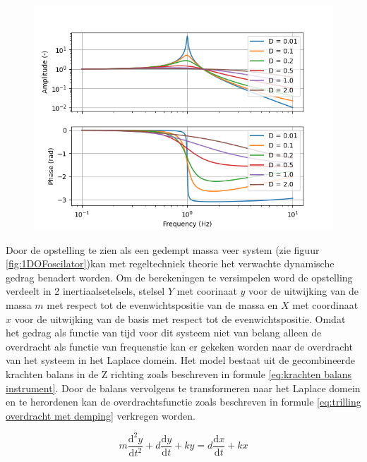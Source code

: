 \documentclass[11pt]{article}
\begin{document}
\begin{figure}[H]
  \begin{minipage}[b]{0.65\textwidth}
    \includegraphics[width=\textwidth]{img/resonance/bode_plot_w01.png}
    \caption{}
    \label{fig:amp_driven_bode}
  \end{minipage}
\end{figure}

Door de opstelling te zien als een gedempt massa veer system (zie figuur \ref{fig:1DOFoscilator})kan met regeltechniek theorie het verwachte dynamische gedrag benadert worden. 
Om de berekeningen te versimpelen word de opstelling verdeelt in 2 inertiaalsetelsels, stelsel $Y$ met coorinaat $y$ voor de uitwijking van de massa $m$ met respect tot de evenwichtspositie van de massa en $X$ met coordinaat $x$ voor de uitwijking van de basis met respect tot de evenwichtspositie.
Omdat het gedrag als functie van tijd voor dit systeem niet van belang alleen de overdracht als functie van frequenstie kan er gekeken worden naar de overdracht van het systeem in het Laplace domein.
Het model bestaat uit de gecombineerde krachten balans in de Z richting zoals beschreven in formule \ref{eq:krachten balans instrument}.
Door de balans vervolgens te transformeren naar het Laplace domein en te herordenen kan de overdrachtsfunctie zoals beschreven in formule \ref{eq:trilling overdracht met demping} verkregen worden.

\begin{equation}
    m \frac{\mathrm{d}^2 y}{\mathrm{d} t^2} + d \frac{\mathrm{d}y}{\mathrm{d}t} +ky = d\frac{\mathrm{d}x}{\mathrm{d}t} + kx
    \label{eq:krachten balans instrument}
\end{equation}
\end{document}
